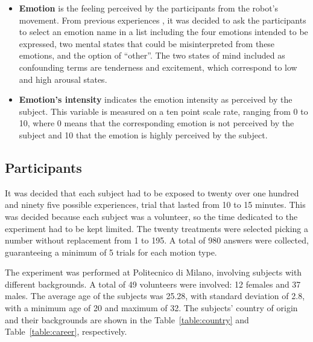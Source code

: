 \begin{itemize}
	\item \textbf{Emotion} is the feeling perceived by the participants from the robot's movement. From previous experiences %
	, it was decided to ask the participants to select an emotion name in a list including the four emotions intended to be expressed, two mental states that could be misinterpreted from these emotions, and the option of ``other''. 
	The two  states of mind included as confounding terms are tenderness and excitement, which correspond to low and high arousal states.
	
	\item \textbf{Emotion's intensity} indicates the emotion intensity as perceived by the subject. This variable is measured on a ten point scale rate, ranging from 0 to 10, where 0 means that the corresponding emotion is not perceived by the subject and 10 that the emotion is highly perceived by the subject. 

\end{itemize}

\subsection{Participants}

It was decided that each subject had to be exposed to twenty over one hundred and ninety five possible experiences, trial that lasted  from 10 to 15 minutes. This was decided because each subject was a volunteer, so the time dedicated to the experiment had to be kept limited. The twenty treatments were selected picking a number without replacement from 1 to 195. A total of 980 answers were collected, guaranteeing a minimum of 5 trials for each motion type. 

The experiment was performed at Politecnico di Milano, involving subjects with different backgrounds.
A total of 49 volunteers were involved: 12 females and 37 males. The average age of the subjects was 25.28, with standard deviation of 2.8, with a minimum age of 20 and maximum of 32. The subjects' country of origin and their backgrounds are shown in the Table~\ref{table:country} and Table~\ref{table:career}, respectively. 

